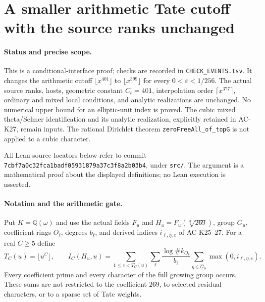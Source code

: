 \section{A smaller arithmetic Tate cutoff with the source ranks unchanged}
\label{sec:cubic-tate-cutoff-transport}

\paragraph{Status and precise scope.}
This is a conditional-interface proof; checks are recorded in
\texttt{CHECK\_EVENTS.tsv}.
It changes the arithmetic cutoff $\lfloor x^{401}\rfloor$ to
$\lfloor x^{399}\rfloor$ for every $0<\varepsilon<1/256$.
The actual source ranks, hosts, geometric
constant $C_t=401$, interpolation order $\lceil x^{377}\rceil$,
ordinary and mixed local conditions, and analytic realizations are
unchanged.  No numerical upper bound for an elliptic-unit index is
proved.  The cubic mixed theta/Selmer identification and its analytic
realization, explicitly retained in AC-K27, remain inputs.  The rational
Dirichlet theorem \texttt{zeroFreeAll\_of\_topG} is not applied to a
cubic character.

All Lean source locators below refer to commit
\texttt{7cbf7a0c32fca1badf05931879a37c3f8a2b03b4}, under \texttt{src/}.
The argument is a mathematical proof about the displayed definitions;
no Lean execution is asserted.

\paragraph{Notation and the arithmetic gate.}
Put $K=\mathbb Q(\omega)$ and use the actual fields $F_u$ and
$H_u=F_u(\sqrt[3]{269})$, group $G_u$, coefficient rings $O_\ell$,
degrees $b_\ell$, and derived indices $i_{\ell,\eta,e}$ of AC-K25--27.
For a real $C\geq 5$ define
\[
 T_C(u)=\lfloor u^C\rfloor,\qquad
 I_C(H_u,u)=\sum_{1\leq e<T_C(u)}\sum_\ell
 \frac{\log\#k_{O_\ell}}{b_\ell}
 \sum_{\eta\in\widehat G_u}\max(0,i_{\ell,\eta,e}).
 \tag{TC.1}
\]
Every coefficient prime and every character of the full growing group
occurs.  These sums are not restricted to the coefficient $269$, to
selected residual characters, or to a sparse set of Tate weights.

